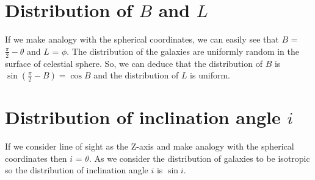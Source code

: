 \section{Distribution of $B$ and $L$}
If we make analogy with the spherical coordinates, we can easily see that $B$ = $\frac{\pi}{2}-\theta$ and $L$ = $\phi$. The distribution of the galaxies are uniformly random in the surface of celestial sphere. So, we can deduce that the distribution of $B$ is $\sin(\frac{\pi}{2}-B)=\cos B$ and the distribution of $L$ is uniform.

\section{Distribution of inclination angle $i$}
If we consider line of sight as the Z-axis and make analogy with the spherical coordinates then $i$ = $\theta$. As we consider the distribution of galaxies to be isotropic so the distribution of inclination angle $i$ is $\sin i$.